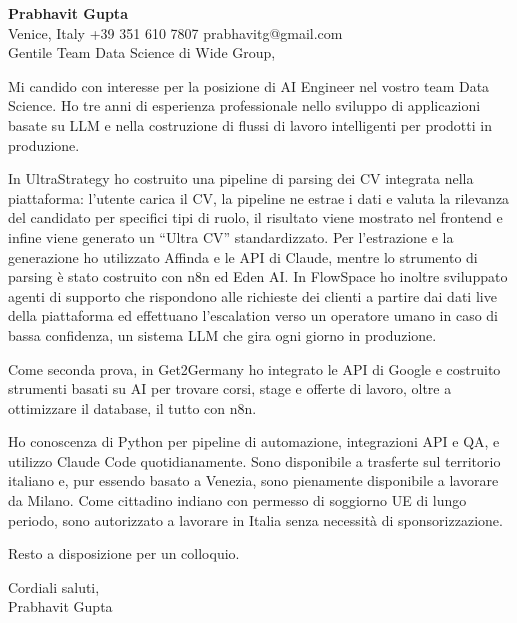 \documentclass[a4paper,10.5pt]{article}
\begin{document}
\textbf{Prabhavit Gupta}\\
Venice, Italy \textbar{} +39 351 610 7807 \textbar{} prabhavitg@gmail.com\\[10pt]
Gentile Team Data Science di Wide Group,

Mi candido con interesse per la posizione di AI Engineer nel vostro team Data Science. Ho tre anni di esperienza professionale nello sviluppo di applicazioni basate su LLM e nella costruzione di flussi di lavoro intelligenti per prodotti in produzione.

In UltraStrategy ho costruito una pipeline di parsing dei CV integrata nella piattaforma: l'utente carica il CV, la pipeline ne estrae i dati e valuta la rilevanza del candidato per specifici tipi di ruolo, il risultato viene mostrato nel frontend e infine viene generato un ``Ultra CV'' standardizzato. Per l'estrazione e la generazione ho utilizzato Affinda e le API di Claude, mentre lo strumento di parsing è stato costruito con n8n ed Eden AI. In FlowSpace ho inoltre sviluppato agenti di supporto che rispondono alle richieste dei clienti a partire dai dati live della piattaforma ed effettuano l'escalation verso un operatore umano in caso di bassa confidenza, un sistema LLM che gira ogni giorno in produzione.

Come seconda prova, in Get2Germany ho integrato le API di Google e costruito strumenti basati su AI per trovare corsi, stage e offerte di lavoro, oltre a ottimizzare il database, il tutto con n8n.

Ho conoscenza di Python per pipeline di automazione, integrazioni API e QA, e utilizzo Claude Code quotidianamente. Sono disponibile a trasferte sul territorio italiano e, pur essendo basato a Venezia, sono pienamente disponibile a lavorare da Milano. Come cittadino indiano con permesso di soggiorno UE di lungo periodo, sono autorizzato a lavorare in Italia senza necessità di sponsorizzazione.

Resto a disposizione per un colloquio.

Cordiali saluti,\\
Prabhavit Gupta
\end{document}
